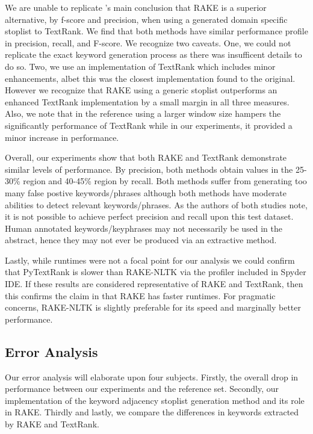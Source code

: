 \documentclass[11pt,a4paper]{article}
\begin{document}
We are unable to replicate \citet{1}'s main conclusion that RAKE is a superior alternative, by f-score and precision, when using a generated domain specific stoplist to TextRank. We find that both methods have similar performance profile in precision, recall, and F-score. We recognize two caveats. One, we could not replicate the exact keyword generation process as there was insufficent details to do so. Two, we use an implementation of TextRank which includes minor enhancements, albet this was the closest implementation found to the original. However we recognize that RAKE using a generic stoplist outperforms an enhanced TextRank implementation by a small margin in all three measures. Also, we note that in the reference using a larger window size hampers the significantly performance of TextRank while in our experiments, it provided a minor increase in performance.   

Overall, our experiments show that both RAKE and TextRank demonstrate similar levels of performance. By precision, both methods obtain values in the 25-30\% region and 40-45\% region by recall. Both methods suffer from generating too many false postive keywords/phrases although both methods have moderate abilities to detect relevant keywords/phrases. As the authors of both studies note, it is not possible to achieve perfect precision and recall upon this test dataset. Human annotated keywords/keyphrases may not necessarily be used in the abstract, hence they may not ever be produced via an extractive method.

Lastly, while runtimes were not a focal point for our analysis we could confirm that PyTextRank is slower than RAKE-NLTK via the profiler included in Spyder IDE. If these results are considered representative of RAKE and TextRank, then this confirms the claim in \citet{1} that RAKE has faster runtimes. For pragmatic concerns, RAKE-NLTK is slightly preferable for its speed and marginally better performance.

\subsection{Error Analysis}
Our error analysis will elaborate upon four subjects. Firstly, the overall drop in performance between our experiments and the reference set. Secondly, our implementation of the keyword adjacency stoplist generation method and its role in RAKE. Thirdly and lastly, we compare the differences in keywords extracted by RAKE and TextRank.
\end{document}
